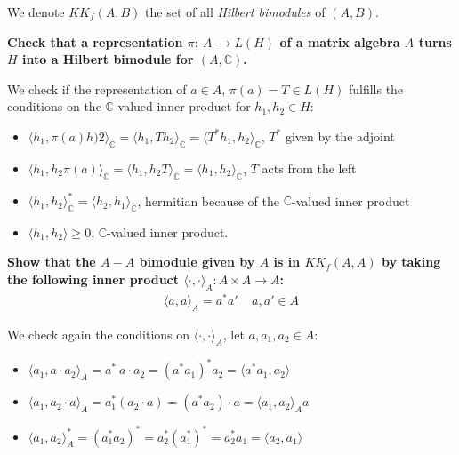 \documentclass[a4paper]{article}
\newcounter{exercise}
\newenvironment{MyExercise}%
{\begin{mdframed}[style=exercisestyle]}{\end{mdframed}}
\theoremstyle{definition}
\theoremstyle{definition}
\theoremstyle{definition}
\theoremstyle{theorem}
\theoremstyle{theorem}
\begin{document}
We denote $KK_f(A,B)$ the set of all \textit{Hilbert bimodules} of $(A,B)$.

\begin{MyExercise}
    \textbf{
    Check that a representation $\pi:\ A \ \rightarrow L(H)$ of a matrix algebra $A$ turns $H$ into
    a Hilbert bimodule for $(A, \mathbb{C})$.
    \label{ex: bimodule}
}\newline


    We check if the representation of $a \in A$, $\pi(a)=T \in L(H)$ fulfills
    the conditions on the $\mathbb{C}$-valued inner product for $h_1, h_2 \in H$:
    \begin{itemize}
        \item $\langle h_1, \pi(a) h)2\rangle _\mathbb{C} = \langle h_1, T h_2\rangle _\mathbb{C} =
            \langle T^* h_1, h_2\rangle _\mathbb{C}$, $T^*$ given by the adjoint
        \item $\langle h_1, h_2 \pi(a)\rangle _\mathbb{C} = \langle h_1, h_2 T\rangle _\mathbb{C} = \langle h_1, h_2\rangle _\mathbb{C}$, $T$ acts from the left
        \item $\langle h_1, h_2\rangle _\mathbb{C}^* = \langle h_2,h_1\rangle _\mathbb{C}$, hermitian because of the
            $\mathbb{C}$-valued inner product
        \item $\langle h_1, h_2\rangle  \ge 0$, $\mathbb{C}$-valued inner product.
    \end{itemize}
\end{MyExercise}

\begin{MyExercise}
    \textbf{
    Show that the $A-A$ bimodule given by $A$ is in $KK_f(A,A)$ by taking the following inner product
    $\langle \cdot,\cdot\rangle_A:A \times A \rightarrow A$:
    \begin{align*}
        \langle a, a\rangle_A = a^*a' \;\;\;\; a,a'\in A
    \end{align*}
    \label{exercise: inner-product}
}\newline


    We check again the conditions on $\langle \cdot, \cdot\rangle _A$, let $a, a_1, a_2 \in A$:
    \begin{itemize}
        \item $\langle a_1, a\cdot a_2\rangle _A = a^*\ a\cdot a_2 = (a^*a_1)^* a_2 = \langle  a^*a_1, a_2\rangle  $
        \item $\langle a_1, a_2 \cdot a\rangle _A = a^*_1 (a_2\cdot a) = (a^*a_2)\cdot a = \langle a_1, a_2\rangle _A a$
        \item $\langle a_1, a_2\rangle _A^* = (a_1^* a_2)^* = a_2^*(a_1^*)^* = a_2^* a_1 = \langle a_2, a_1\rangle $
    \end{itemize}
\end{MyExercise}
\end{document}
